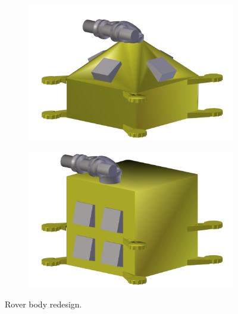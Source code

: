 \documentclass[twocolumn,letterpaper]{IEEEAerospaceCLS}  %
\newlength{\subfigureWidth}
\newlength{\graphicsHeight}
\begin{document}
\begin{figure}[h]
\captionsetup[subfigure]{justification=centering}
  \centering
  \setlength{\subfigureWidth}{0.24\textwidth}
  \setlength{\graphicsHeight}{29mm}
  \begin{subfigure}[t]{\subfigureWidth}
    \centering
    \includegraphics[height=\graphicsHeight]{figures/images/body-before.png}
    \label{fig:sub:rover-body-redesign-before}
    \end{subfigure}\hfill
  \begin{subfigure}[t]{\subfigureWidth}
    \centering
    \includegraphics[height=\graphicsHeight]{figures/images/body-after.png}
    \label{fig:sub:rover-body-redesign-after}
  \end{subfigure}
  \caption{Rover body redesign.}
  \label{fig:rover-body-redesign}
\end{figure}
\end{document}
